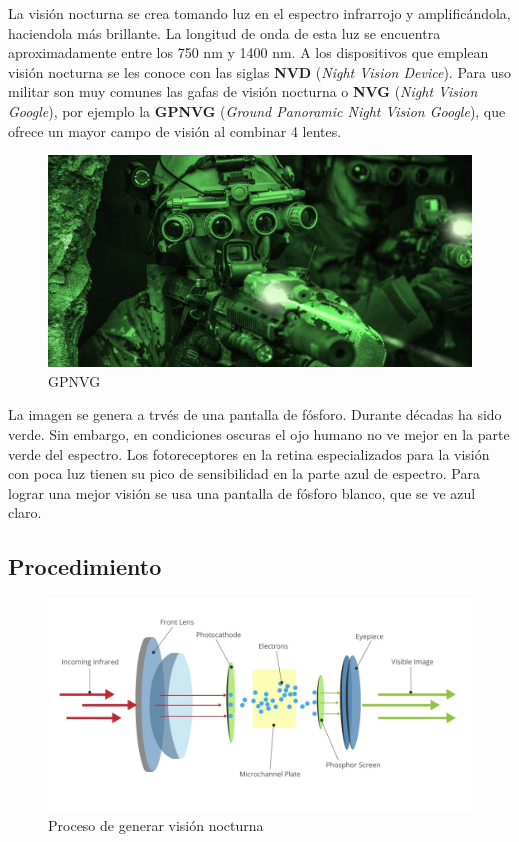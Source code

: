 La visión nocturna se crea tomando luz en el espectro infrarrojo y amplificándola, haciendola más brillante. La longitud de onda de esta luz se encuentra aproximadamente entre los 750 nm y 1400 nm. A los dispositivos que emplean visión nocturna se les conoce con las siglas \textbf{NVD} (\textit{Night Vision Device}). Para uso militar son muy comunes las gafas de visión nocturna o \textbf{NVG} (\textit{Night Vision Google}), por ejemplo la \textbf{GPNVG} (\textit{Ground Panoramic Night Vision Google}), que ofrece un mayor campo de visión al combinar 4 lentes.

\begin{figure}[H]
  \centering
  \includegraphics[scale=0.4]{imagenes/nvg.png}
  \caption{GPNVG\cite{tactgearnv}}
\end{figure}

La imagen se genera a trvés de una pantalla de fósforo. Durante décadas ha sido verde. Sin embargo, en condiciones oscuras el ojo humano no ve mejor en la parte verde del espectro. Los fotoreceptores en la retina especializados para la visión con poca luz tienen su pico de sensibilidad en la parte azul de espectro. Para lograr una mejor visión se usa una pantalla de fósforo blanco, que se ve azul claro.

\subsection{Procedimiento}

\begin{figure}[H]
  \centering
  \includegraphics[scale=0.4]{imagenes/vision_nocturna.png}
  \caption{Proceso de generar visión nocturna\cite{jpnvnv}}
\end{figure}

